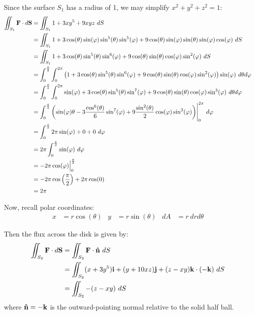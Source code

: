 \begin{solution}
    Since the surface \(S_1\) has a radius of 1, we may simplify \(x^2 + y^2 + z^2 = 1\):
    \begin{align*}
        \iint_{S_1} \vb{F} \cdot d\vb{S} &= \iint_{S_1} 1 + 3xy^5 + 9xyz \ dS \\
        &= \iint_{S_1} 1 + 3\cos(\theta) \sin(\varphi)\sin^5(\theta) \sin^5(\varphi) + 9\cos(\theta) \sin(\varphi)\sin(\theta) \sin(\varphi)\cos(\varphi) \ dS \\
        &= \iint_{S_1} 1 + 3\cos(\theta)\sin^5(\theta)\sin^6(\varphi) + 9\cos(\theta)\sin(\theta) \cos(\varphi)\sin^2(\varphi) \ dS \\
        &= \int_{0}^{\frac{\pi}{2}} \int_0^{2\pi} \left(1 + 3\cos(\theta)\sin^5(\theta)\sin^6(\varphi) + 9\cos(\theta)\sin(\theta) \cos(\varphi)\sin^2(\varphi)\right) \sin(\varphi) \ d\theta d\varphi \\
        &= \int_{0}^{\frac{\pi}{2}} \int_0^{2\pi} \sin(\varphi) + 3\cos(\theta)\sin^5(\theta)\sin^7(\varphi) + 9\cos(\theta)\sin(\theta) \cos(\varphi)\sin^3(\varphi) \ d\theta d\varphi \\
        &= \int_{0}^{\frac{\pi}{2}} \left( \sin(\varphi) \theta - 3\frac{\cos^6(\theta)}{6}\sin^7(\varphi) + 9\frac{\sin^2(\theta)}{2} \cos(\varphi)\sin^3(\varphi)\right)\Biggr|_0^{2\pi} \ d\varphi \\
        &= \int_{0}^{\frac{\pi}{2}} 2\pi\sin(\varphi) + 0 + 0 \ d\varphi \\
        &= 2\pi\int_{0}^{\frac{\pi}{2}} \sin(\varphi) \ d\varphi \\
        &= - 2\pi \cos(\varphi) \Big|_0^{\frac{\pi}{2}} \\
        &= - 2\pi \cos\left(\frac{\pi}{2}\right) + 2\pi \cos(0) \\
        &= 2\pi
    \end{align*}
    
    Now, recall polar coordinates:
    \begin{align}
        x &= r \cos(\theta) & y &= r \sin(\theta) & dA &= r \ dr d\theta
    \end{align}
    
    Then the flux across the disk is given by:
    \begin{align*}
        \iint_{S_2} \vb{F} \cdot d\vb{S} &= \iint_{S_2} \vb{F} \cdot \vb{\hat{n}} \ dS \\
        &= \iint_{S_2} (x + 3y^5) \vb{i} + (y + 10xz) \vb{j} + (z - xy) \vb{k} \cdot (-\vb{k}) \ dS \\
        &= \iint_{S_2} -(z - xy) \ dS
    \end{align*}
    where \(\vb{\hat{n}} = -\vb{k}\) is the outward-pointing normal relative to the solid half ball.
    

\end{solution}
